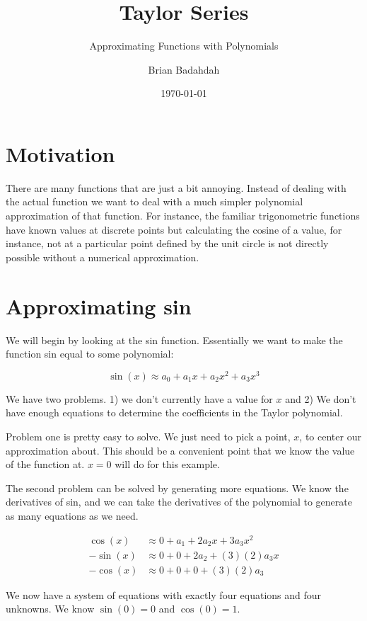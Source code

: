\documentclass[landscape, twocolumn, 12pt]{article}
\title{Taylor Series}
\subtitle{Approximating Functions with Polynomials}
\author{Brian Badahdah}
\date{\today}
\begin{document}
\maketitle
\section{Motivation}

There are many functions that are just a bit annoying. Instead of dealing with the actual function we want to deal with a much simpler polynomial approximation of that function. For instance, the familiar trigonometric functions have known values at discrete points but calculating the cosine of a value, for instance, not at a particular point defined by the unit circle is not directly possible without a numerical approximation. 

\section{Approximating sin}
We will begin by looking at the sin function. Essentially we want to make the function sin equal to some polynomial:

\begin{equation}
  \sin(x)\approx a_0 + a_1x+a_2x^2 + a_3x^3
\end{equation}

We have two problems. 1) we don't currently have a value for $x$ and 2) We don't have enough equations to determine the coefficients in the Taylor polynomial.

Problem one is pretty easy to solve. We just need to pick a point, $x$, to center our approximation about. This should be a convenient point that we know the value of the function at. $x=0$ will do for this example.

The second problem can be solved by generating more equations. We know the derivatives of sin, and we can take the derivatives of the polynomial to generate as many equations as we need.

\begin{align}
  \cos(x)  &\approx 0   +a_1  +2a_2x  +3a_3x^2\\
  -\sin(x) &\approx 0   +0    +2a_2   +(3)(2)a_3x\\
  -\cos(x) &\approx 0   +0    +0      +(3)(2)a_3
\end{align}

We now have a system of equations with exactly four equations and four unknowns. We know $\sin(0)=0$ and $\cos(0)=1$.
\end{document}
